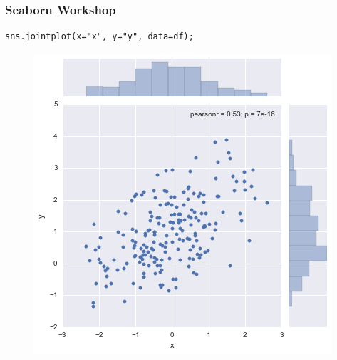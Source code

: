 \documentclass{beamer}
\begin{document}
\begin{frame}[fragile]
	\frametitle{Seaborn Workshop}
	\large
	\begin{framed}
\begin{verbatim}
sns.jointplot(x="x", y="y", data=df);
\end{verbatim}
\end{framed}
\begin{figure}
\centering
\includegraphics[width=0.55\linewidth]{images/distributions_30_0}
\end{figure}

\end{frame}
\end{document}
